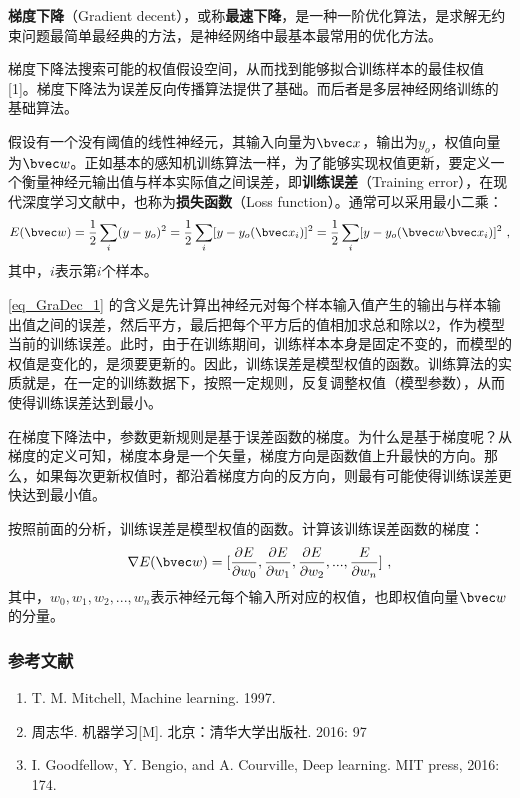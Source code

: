 
\textbf{梯度下降}（Gradient decent），或称\textbf{最速下降}，是一种一阶优化算法，是求解无约束问题最简单最经典的方法，是神经网络中最基本最常用的优化方法。

梯度下降法搜索可能的权值假设空间，从而找到能够拟合训练样本的最佳权值 [1]。梯度下降法为误差反向传播算法提供了基础。而后者是多层神经网络训练的基础算法。

假设有一个没有阈值的线性神经元，其输入向量为$\bvec x$，输出为$y_o$，权值向量为$\bvec w$。正如基本的感知机训练算法一样，为了能够实现权值更新，要定义一个衡量神经元输出值与样本实际值之间误差，即\textbf{训练误差}（Training error），在现代深度学习文献中，也称为\textbf{损失函数}（Loss function）。通常可以采用最小二乘：
\begin{equation}\label{eq_GraDec_1}
E(\bvec w)=\frac{1}{2}\sum_i(y-y_o)^2=\frac{1}{2}\sum_i[y-y_o(\bvec x_i)]^2=\frac{1}{2}\sum_i[y-y_o(\bvec w \bvec x_i)]^2~,
\end{equation}
其中，$i$表示第$i$个样本。

\autoref{eq_GraDec_1} 的含义是先计算出神经元对每个样本输入值产生的输出与样本输出值之间的误差，然后平方，最后把每个平方后的值相加求总和除以$2$，作为模型当前的训练误差。此时，由于在训练期间，训练样本本身是固定不变的，而模型的权值是变化的，是须要更新的。因此，训练误差是模型权值的函数。训练算法的实质就是，在一定的训练数据下，按照一定规则，反复调整权值（模型参数），从而使得训练误差达到最小。

在梯度下降法中，参数更新规则是基于误差函数的梯度。为什么是基于梯度呢？从梯度的定义可知，梯度本身是一个矢量，梯度方向是函数值上升最快的方向。那么，如果每次更新权值时，都沿着梯度方向的反方向，则最有可能使得训练误差更快达到最小值。

按照前面的分析，训练误差是模型权值的函数。计算该训练误差函数的梯度：
\begin{equation}
\nabla E(\bvec w)=[\frac{\partial E}{\partial w_0},\frac{ \partial E}{\partial w_1},\frac{\partial E}{\partial w_2},...,\frac{E}{\partial w_n}]~,
\end{equation}
其中，$w_0,w_1,w_2, ..., w_n$表示神经元每个输入所对应的权值，也即权值向量$\bvec w$的分量。



\subsubsection{参考文献}
\begin{enumerate}
\item T. M. Mitchell, Machine learning. 1997.
\item 周志华. 机器学习[M]. 北京：清华大学出版社. 2016: 97
\item I. Goodfellow, Y. Bengio, and A. Courville, Deep learning. MIT press, 2016: 174.
\end{enumerate}